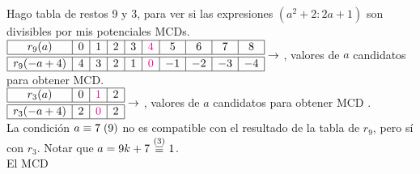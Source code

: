 Hago tabla de restos 9 y 3, para ver si las expresiones $(a^2 + 2 : 2a+1)$ son divisibles por mis potenciales MCDs.\\

\noindent$\begin{array}{|c|c|c|c|c|c|c|c|c|c|c|}
		\hline
		r_9(a)      & 0 & 1 & 2 & 3 & \textcolor{magenta}{4} & 5  & 6  & 7  & 8  \\ \hline\hline
		r_9(-a + 4) & 4 & 3 & 2 & 1 & \textcolor{magenta}{0} & -1 & -2 & -3 & -4 \\ \hline
	\end{array} \to$ , valores de $a$ candidatos para obtener MCD.\\

\noindent$\begin{array}{|c|c|c|c|}
		\hline
		r_3(a)      & 0 & \textcolor{magenta}{1} & 2 \\ \hline\hline
		r_3(-a + 4) & 2 & \textcolor{magenta}{0} & 2 \\ \hline
	\end{array} \to$ ,  valores de $a$ candidatos para obtener MCD .\\
La condición $a \equiv 7 \;(9)$ no es compatible con el resultado de la tabla de $r_9$, pero sí con $r_3$. Notar que
$a = 9k + 7 \stackrel{(3)}{\, \equiv \,} 1 $. \\
El MCD  \Tilde










\newpage


